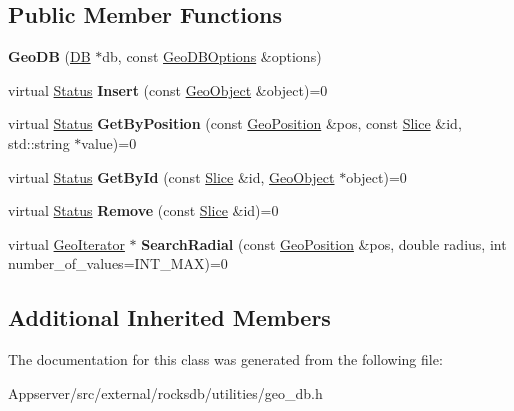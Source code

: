 \subsection*{Public Member Functions}
\begin{DoxyCompactItemize}
\item 
{\bfseries Geo\+DB} (\hyperlink{classrocksdb_1_1DB}{DB} $\ast$db, const \hyperlink{structrocksdb_1_1GeoDBOptions}{Geo\+D\+B\+Options} \&options)\hypertarget{classrocksdb_1_1GeoDB_aea4cdd1e86027b6126059e8eb2245c25}{}\label{classrocksdb_1_1GeoDB_aea4cdd1e86027b6126059e8eb2245c25}

\item 
virtual \hyperlink{classrocksdb_1_1Status}{Status} {\bfseries Insert} (const \hyperlink{classrocksdb_1_1GeoObject}{Geo\+Object} \&object)=0\hypertarget{classrocksdb_1_1GeoDB_a81c9e2268ccb793802cf44c69b1ea942}{}\label{classrocksdb_1_1GeoDB_a81c9e2268ccb793802cf44c69b1ea942}

\item 
virtual \hyperlink{classrocksdb_1_1Status}{Status} {\bfseries Get\+By\+Position} (const \hyperlink{classrocksdb_1_1GeoPosition}{Geo\+Position} \&pos, const \hyperlink{classrocksdb_1_1Slice}{Slice} \&id, std\+::string $\ast$value)=0\hypertarget{classrocksdb_1_1GeoDB_ac53062674afd942131c8503ace4e863c}{}\label{classrocksdb_1_1GeoDB_ac53062674afd942131c8503ace4e863c}

\item 
virtual \hyperlink{classrocksdb_1_1Status}{Status} {\bfseries Get\+By\+Id} (const \hyperlink{classrocksdb_1_1Slice}{Slice} \&id, \hyperlink{classrocksdb_1_1GeoObject}{Geo\+Object} $\ast$object)=0\hypertarget{classrocksdb_1_1GeoDB_a8f62bab51de989169f88875313323740}{}\label{classrocksdb_1_1GeoDB_a8f62bab51de989169f88875313323740}

\item 
virtual \hyperlink{classrocksdb_1_1Status}{Status} {\bfseries Remove} (const \hyperlink{classrocksdb_1_1Slice}{Slice} \&id)=0\hypertarget{classrocksdb_1_1GeoDB_a3079e4b1fe9f8da662f136b4bcf73354}{}\label{classrocksdb_1_1GeoDB_a3079e4b1fe9f8da662f136b4bcf73354}

\item 
virtual \hyperlink{classrocksdb_1_1GeoIterator}{Geo\+Iterator} $\ast$ {\bfseries Search\+Radial} (const \hyperlink{classrocksdb_1_1GeoPosition}{Geo\+Position} \&pos, double radius, int number\+\_\+of\+\_\+values=I\+N\+T\+\_\+\+M\+AX)=0\hypertarget{classrocksdb_1_1GeoDB_af7201ce086b3ceba0b6e0b7ba108a284}{}\label{classrocksdb_1_1GeoDB_af7201ce086b3ceba0b6e0b7ba108a284}

\end{DoxyCompactItemize}
\subsection*{Additional Inherited Members}


The documentation for this class was generated from the following file\+:\begin{DoxyCompactItemize}
\item 
Appserver/src/external/rocksdb/utilities/geo\+\_\+db.\+h\end{DoxyCompactItemize}
